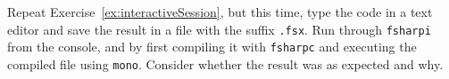 Repeat Exercise~\ref{ex:interactiveSession}, but this time, type the code in a text editor and save the result in a file with the suffix \texttt{.fsx}. Run through \lstinline[language=console]{fsharpi} from the console, and by first compiling it with \lstinline[language=console]{fsharpc} and executing the compiled file using \lstinline[language=console]{mono}. Consider whether the result was as expected and why.